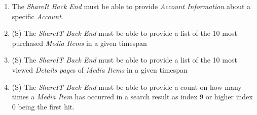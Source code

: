 \begin{enumerate}[label=\textbf{FR-\twodigits*}, resume]
\item The \textit{ShareIt Back End} must be able to provide \textit{Account Information} about a specific \textit{Account}.

\item (S) The \textit{ShareIT Back End} must be able to provide a list of the 10 most purchased \textit{Media Items} in a given timespan

\item (S) The \textit{ShareIT Back End} must be able to provide a list of the 10 most viewed \textit{Details page}s of \textit{Media Items} in a given timespan

\item (S) The \textit{ShareIT Back End} must be able to provide a count on how many times a \textit{Media Item} has occurred in a search result as index 9 or higher index 0 being the first hit. 

\end{enumerate}

